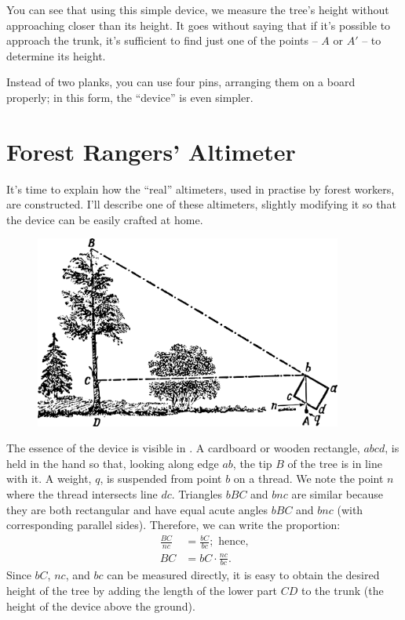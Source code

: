 You can see that using this simple device, we measure the tree's height without approaching closer than its height. It goes without saying that if it's possible to approach the trunk, it's sufficient to find just one of the points -- $A$ or $A'$ -- to determine its height.

Instead of two planks, you can use four pins, arranging them on a board properly; in this form, the ``device'' is even simpler.


\section{Forest Rangers' Altimeter}
\label{sec-1.7}

It's time to explain how the ``real'' altimeters, used in practise by forest workers, are constructed. I'll describe one of these altimeters, slightly modifying it so that the device can be easily crafted at home. 

\begin{figure}[h!]
\centering
\includegraphics[width=0.9\textwidth]{figures/ch-01/fig-01-11.pdf}
\end{figure}


The essence of the device is visible in . A cardboard or wooden rectangle, $abcd$, is held in the hand so that, looking along edge $ab$, the tip $B$ of the tree is in line with it. A weight, $q$, is suspended from point $b$ on a thread. We note the point $n$ where the thread intersects line $dc$. Triangles $bBC$ and $bnc$ are similar because they are both rectangular and have equal acute angles $bBC$ and $bnc$ (with corresponding parallel sides). Therefore, we can write the proportion:
\begin{align*}%
\frac{BC}{nc} & = \frac{bC}{bc}; \,\, \text{hence,} \\
BC & = bC \cdot \frac{nc}{bc}.
\end{align*}
Since $bC$, $nc$, and $bc$ can be measured directly, it is easy to obtain the desired height of the tree by adding the length of the lower part $CD$ to the trunk (the height of the device above the ground). 

